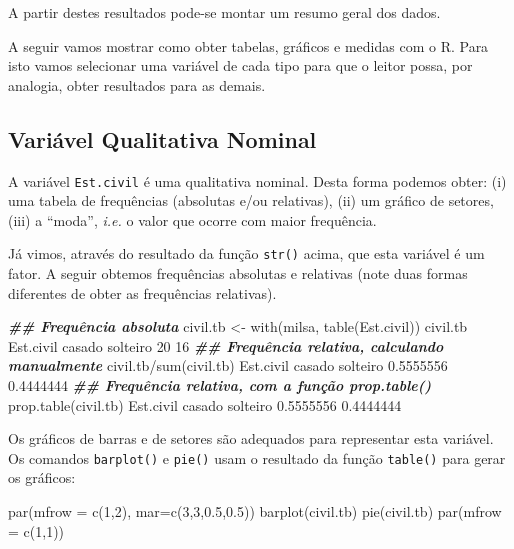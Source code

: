 \documentclass[
  10pt,
  a4paper]{book}
\newenvironment{Shaded}{\begin{snugshade}}{\end{snugshade}}
\newcommand{\AttributeTok}[1]{\textcolor[rgb]{0.77,0.63,0.00}{#1}}
\newcommand{\DecValTok}[1]{\textcolor[rgb]{0.00,0.00,0.81}{#1}}
\newcommand{\DocumentationTok}[1]{\textcolor[rgb]{0.56,0.35,0.01}{\textbf{\textit{#1}}}}
\newcommand{\FloatTok}[1]{\textcolor[rgb]{0.00,0.00,0.81}{#1}}
\newcommand{\FunctionTok}[1]{\textcolor[rgb]{0.00,0.00,0.00}{#1}}
\newcommand{\NormalTok}[1]{#1}
\newcommand{\OtherTok}[1]{\textcolor[rgb]{0.56,0.35,0.01}{#1}}
\newcommand{\SpecialCharTok}[1]{\textcolor[rgb]{0.00,0.00,0.00}{#1}}
\begin{document}
A partir destes resultados pode-se montar um resumo geral dos dados.

A seguir vamos mostrar como obter tabelas, gráficos e medidas com o R.
Para isto vamos selecionar uma variável de cada tipo para que o leitor
possa, por analogia, obter resultados para as demais.

\hypertarget{variuxe1vel-qualitativa-nominal}{%
\subsection{Variável Qualitativa Nominal}\label{variuxe1vel-qualitativa-nominal}}

A variável \texttt{Est.civil} é uma qualitativa nominal. Desta forma podemos
obter: (i) uma tabela de frequências (absolutas e/ou relativas), (ii) um
gráfico de setores, (iii) a ``moda'', \emph{i.e.} o valor que ocorre com maior
frequência.

Já vimos, através do resultado da função \texttt{str()} acima, que esta
variável é um fator. A seguir obtemos frequências absolutas e relativas
(note duas formas diferentes de obter as frequências relativas).

\begin{Shaded}
\begin{Highlighting}[]
\DocumentationTok{\#\# Frequência absoluta}
\NormalTok{civil.tb }\OtherTok{\textless{}{-}} \FunctionTok{with}\NormalTok{(milsa, }\FunctionTok{table}\NormalTok{(Est.civil))}
\NormalTok{civil.tb}
\NormalTok{Est.civil}
\NormalTok{  casado solteiro }
      \DecValTok{20}       \DecValTok{16} 
\DocumentationTok{\#\# Frequência relativa, calculando manualmente}
\NormalTok{civil.tb}\SpecialCharTok{/}\FunctionTok{sum}\NormalTok{(civil.tb)}
\NormalTok{Est.civil}
\NormalTok{   casado  solteiro }
\FloatTok{0.5555556} \FloatTok{0.4444444} 
\DocumentationTok{\#\# Frequência relativa, com a função prop.table()}
\FunctionTok{prop.table}\NormalTok{(civil.tb)}
\NormalTok{Est.civil}
\NormalTok{   casado  solteiro }
\FloatTok{0.5555556} \FloatTok{0.4444444} 
\end{Highlighting}
\end{Shaded}

Os gráficos de barras e de setores são adequados para representar esta
variável. Os comandos \texttt{barplot()} e \texttt{pie()} usam o resultado da função
\texttt{table()} para gerar os gráficos:

\begin{Shaded}
\begin{Highlighting}[]
\FunctionTok{par}\NormalTok{(}\AttributeTok{mfrow =} \FunctionTok{c}\NormalTok{(}\DecValTok{1}\NormalTok{,}\DecValTok{2}\NormalTok{), }\AttributeTok{mar=}\FunctionTok{c}\NormalTok{(}\DecValTok{3}\NormalTok{,}\DecValTok{3}\NormalTok{,}\FloatTok{0.5}\NormalTok{,}\FloatTok{0.5}\NormalTok{))}
\FunctionTok{barplot}\NormalTok{(civil.tb)}
\FunctionTok{pie}\NormalTok{(civil.tb)}
\FunctionTok{par}\NormalTok{(}\AttributeTok{mfrow =} \FunctionTok{c}\NormalTok{(}\DecValTok{1}\NormalTok{,}\DecValTok{1}\NormalTok{))}
\end{Highlighting}
\end{Shaded}
\end{document}
